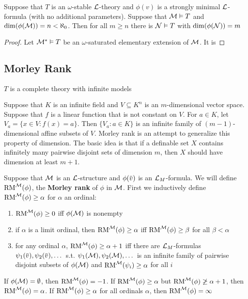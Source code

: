\documentclass[11pt]{article}
\begin{document}
\begin{lemma}[]
Suppose that \(T\) is an \(\omega\)-stable \(\mathcal{L}\)-theory and \(\phi(v)\) is a strongly minimal \(\mathcal{L}\)-formula
(with no additional parameters). Suppose that \(\mathcal{M}\vDash T\) and \(\dim(\phi(\mathcal{M}))=n<\aleph_0\). Then for
all \(m\ge n\) there is \(\mathcal{N}\vDash T\) with \(\dim(\phi(\mathcal{N}))=m\)
\end{lemma}

\begin{proof}
Let \(\mathcal{M}^*\vDash T\)  be an \(\omega\)-saturated elementary extension of \(\mathcal{M}\). It is
\end{proof}

\subsection{Morley Rank}
\label{sec:org94a8701}
\(T\) is a complete theory with infinite models

Suppose that \(K\) is an infinite field and \(V\subseteq K^n\) is an \(m\)-dimensional vector space.
Suppose that \(f\) is a linear function that is not constant on \(V\). For \(a\in K\),
let \(V_a=\{x\in V:f(x)=a\}\). Then \(\{V_a:a\in K\}\) is an infinite family of \((m-1)\)-dimensional
affine subsets of \(V\). Morley rank is an attempt to generalize this property of dimension. The
basic idea is that if a definable set \(X\) contains infinitely many pairwise disjoint sets of
dimension \(m\), then \(X\) should have dimension at least \(m+1\).

\begin{definition}[]
Suppose that \(\mathcal{M}\) is an \(\mathcal{L}\)-structure and \(\phi(\barv)\) is an \(\mathcal{L}_M\)-formula. We will
define \(\operatorname{RM}^{\mathcal{M}}(\phi)\), the \textbf{Morley rank} of \(\phi\) in \(\mathcal{M}\). First we inductively
define \(\operatorname{RM}^{\mathcal{M}}(\phi)\ge\alpha\) for \(\alpha\) an ordinal:
\begin{enumerate}
\item \(\operatorname{RM}^{\mathcal{M}}(\phi)\ge 0\) iff \(\phi(\mathcal{M})\) is nonempty
\item if \(\alpha\) is a limit ordinal, then \(\operatorname{RM}^{\mathcal{M}}(\phi)\ge\alpha\) iff \(\operatorname{RM}^{\mathcal{M}}(\phi)\ge\beta\) for all \(\beta<\alpha\)
\item for any ordinal \(\alpha\), \(\operatorname{RM}^{\mathcal{M}}(\phi)\ge\alpha+1\) iff there
are \(\mathcal{L}_M\)-formulas \(\psi_1(\barv),\psi_2(\barv),\dots\) s.t. \(\psi_1(\mathcal{M}),\psi_2(\mathcal{M}),\dots\) is an infinite family
of pairwise disjoint subsets of \(\phi(\mathcal{M})\) and \(\operatorname{RM}^{\mathcal{M}}(\psi_i)\ge\alpha\) for all \(i\)
\end{enumerate}


If \(\phi(\mathcal{M})=\emptyset\), then \(\operatorname{RM}^{\mathcal{M}}(\phi)=-1\). If \(\operatorname{RM}^{\mathcal{M}}(\phi)\ge\alpha\) but \(\operatorname{RM}^{\mathcal{M}}(\phi)\not\ge\alpha+1\),
then \(\operatorname{RM}^{\mathcal{M}}(\phi)=\alpha\). If \(\operatorname{RM}^{\mathcal{M}}(\phi)\ge\alpha\) for all ordinals \(\alpha\), then \(\operatorname{RM}^{\mathcal{M}}(\phi)=\infty\)
\end{definition}
\end{document}
